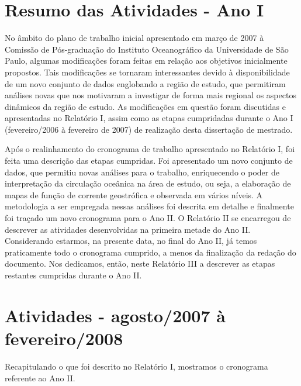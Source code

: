 \documentclass[12pt,portuguese,a4paper,pdftex]{article}
\begin{document}

\newpage
\section*{Resumo das Atividades - Ano I}

\hspace{4mm}  No âmbito do plano de trabalho inicial apresentado em março de 2007 à Comissão de Pós-graduação 
do  Instituto Oceanográfico da Universidade de São Paulo, algumas mo\-di\-fi\-ca\-ções 
foram feitas em relação aos objetivos inicialmente propostos. Tais modificações se tornaram interessantes
devido à disponibilidade de um novo conjunto de dados englobando a região de estudo, que permitiram
análises novas que nos motivaram a investigar de forma mais regional os aspectos dinâmicos 
da região de estudo. As modificações em questão foram discutidas e apresentadas no Relatório I, assim
como as etapas cumpridadas durante o Ano I (fevereiro/2006 à fevereiro de 2007) de realização desta dissertação de mestrado. 

Após o realinhamento do cronograma de trabalho apresentado no Relatório I, foi feita uma descrição 
das etapas cumpridas. Foi apresentado um novo conjunto de dados, 
que permitiu novas análises para o trabalho, enriquecendo o poder de in\-ter\-pre\-ta\-ção da circulação 
oceânica na área de estudo, ou seja, a elaboração de mapas de função de corrente geostrófica 
e observada em vários níveis. A metodologia a ser empregada nessas análises foi descrita em detalhe
e finalmente foi traçado um novo cronograma para o Ano II. O Relatório II se encarregou de 
descrever as atividades desenvolvidas na primeira metade do Ano II.  Considerando estarmos, na presente data, no final do 
Ano II, já temos praticamente todo o cronograma cumprido, a menos da finalização da redação do documento. Nos dedicamos, então,
neste Relatório III a descrever as etapas restantes cumpridas durante o Ano II.

\newpage
\section{Atividades - agosto/2007 à fevereiro/2008}\label{sec:new}

\hspace{4mm} Recapitulando o que foi descrito no Relatório I, mostramos o cronograma referente ao Ano II.
\end{document}

